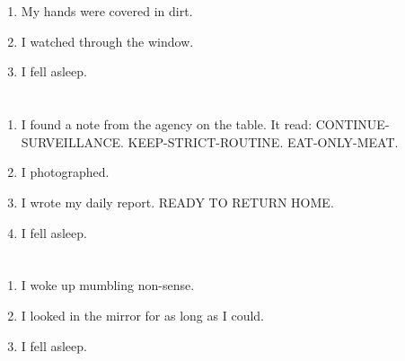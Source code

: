 \documentclass{article}
\begin{document}
    \section{}
    
    \begin{enumerate}
    
    \item My hands were covered in dirt.\\
    
    \item I watched through the window.\\
    
    \item I fell asleep.\\
    
    \end{enumerate}
     
    \newpage
    
    \section{}
    
    \begin{enumerate}
    
    \item I found a note from the agency on the table. It read: CONTINUE-SURVEILLANCE. KEEP-STRICT-ROUTINE. EAT-ONLY-MEAT.\\
    
    \item I photographed.\\
    
    \item I wrote my daily report. READY TO RETURN HOME.\\
    
    \item I fell asleep.\\
    
    \end{enumerate}
     
    \newpage
    
    \section{}
    
    \begin{enumerate}
    
    \item I woke up mumbling non-sense.\\
    
    \item I looked in the mirror for as long as I could.\\
    
    \item I fell asleep.\\
    
    \end{enumerate}
     
\end{document}
